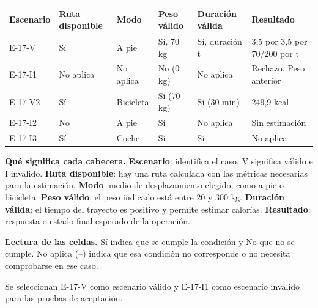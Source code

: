 \begingroup\fontsize{7.8}{11}\selectfont\setlength{\tabcolsep}{3pt}
\begin{tabularx}{\linewidth}{@{}*{6}{Y}@{}}\toprule
\textbf{Escenario} & \textbf{Ruta disponible} & \textbf{Modo} & \textbf{Peso válido} & \textbf{Duración válida} & \textbf{Resultado}\\\midrule
E-17-V & Sí & A pie & Sí, 70 kg & Sí, duración t & 3,5 por 3,5 por 70/200 por t\\[3pt]
E-17-I1 & No aplica & No aplica & No (0 kg) & No aplica & Rechazo. Peso anterior\\[3pt]
E-17-V2 & Sí & Bicicleta & Sí (70 kg) & Sí (30 min) & 249,9 kcal\\[3pt]
E-17-I2 & No & A pie & Sí & No aplica & Sin estimación\\[3pt]
E-17-I3 & Sí & Coche & Sí & Sí & No aplica\\[3pt]
\bottomrule\end{tabularx}\endgroup\par
{\fontsize{9}{11}\selectfont\textbf{Qué significa cada cabecera.} \textbf{Escenario}: identifica el caso. V significa válido e I inválido. \textbf{Ruta disponible}: hay una ruta calculada con las métricas necesarias para la estimación. \textbf{Modo}: medio de desplazamiento elegido, como a pie o bicicleta. \textbf{Peso válido}: el peso indicado está entre 20 y 300 kg. \textbf{Duración válida}: el tiempo del trayecto es positivo y permite estimar calorías. \textbf{Resultado}: respuesta o estado final esperado de la operación.\par\textbf{Lectura de las celdas.} Sí indica que se cumple la condición y No que no se cumple. No aplica (--) indica que esa condición no corresponde o no necesita comprobarse en ese caso.\par}


Se seleccionan E-17-V como escenario válido y E-17-I1 como escenario inválido para las pruebas de aceptación.\par



